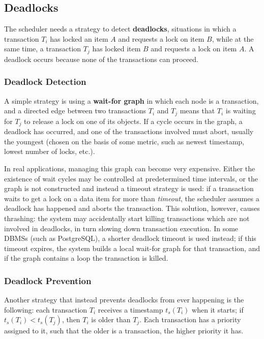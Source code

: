 
\subsection{Deadlocks}

The scheduler needs a strategy to detect \textbf{deadlocks}, situations in which a transaction $T_i$ has locked an item $A$ and requests a lock on item $B$, while at the same time, a transaction $T_j$ has locked item $B$ and requests a lock on item $A$. A deadlock occurs because none of the transactions can proceed.

\subsubsection{Deadlock Detection}

A simple strategy is using a \textbf{wait-for graph} in which each node is a transaction, and a directed edge between two transactions $T_i$ and $T_j$ means that $T_i$ is waiting for $T_j$ to release a lock on one of its objects. If a cycle occurs in the graph, a deadlock has occurred, and one of the transactions involved must abort, usually the youngest (chosen on the basis of some metric, such as newest timestamp, lowest number of locks, etc.).

In real applications, managing this graph can become very expensive. Either the existence of wait cycles may be controlled at predetermined time intervals, or the graph is not constructed and instead a timeout strategy is used: if a transaction waits to get a lock on a data item for more than \textit{timeout}, the scheduler assumes a deadlock has happened and aborts the transaction. This solution, however, causes thrashing: the system may accidentally start killing transactions which are not involved in deadlocks, in turn slowing down transaction execution. In some DBMSs (such as PostgreSQL), a shorter deadlock timeout is used instead; if this timeout expires, the system builds a local wait-for graph for that transaction, and if the graph contains a loop the transaction is killed.

\subsubsection{Deadlock Prevention}

Another strategy that instead prevents deadlocks from ever happening is the following: each transaction $T_i$ receives a timestamp $t_s(T_i)$ when it starts; if $t_s(T_i) < t_s(T_j)$, then $T_i$ is older than $T_j$. Each transaction has a priority assigned to it, such that the older is a transaction, the higher priority it has.

